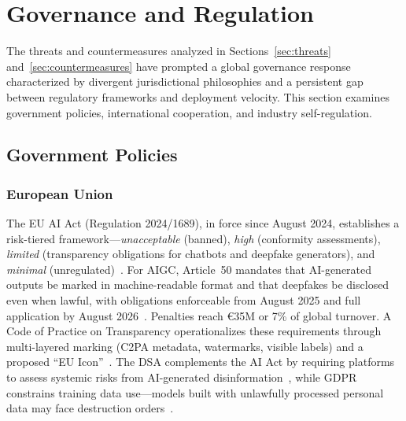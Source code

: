 
\section{Governance and Regulation}
\label{sec:governance}

The threats and countermeasures analyzed in Sections~\ref{sec:threats} and~\ref{sec:countermeasures} have prompted a global governance response characterized by divergent jurisdictional philosophies and a persistent gap between regulatory frameworks and deployment velocity. This section examines government policies, international cooperation, and industry self-regulation.


\subsection{Government Policies}
\label{sec:gov-policy}

\subsubsection{European Union}
\label{sec:gov-eu}

The EU AI Act (Regulation 2024/1689), in force since August 2024, establishes a risk-tiered framework---\emph{unacceptable} (banned), \emph{high} (conformity assessments), \emph{limited} (transparency obligations for chatbots and deepfake generators), and \emph{minimal} (unregulated)~\cite{euaiact2024}. For AIGC, Article~50 mandates that AI-generated outputs be marked in machine-readable format and that deepfakes be disclosed even when lawful, with obligations enforceable from August 2025 and full application by August 2026~\cite{euaiact_art50}. Penalties reach \euro35M or 7\% of global turnover. A Code of Practice on Transparency operationalizes these requirements through multi-layered marking (C2PA metadata, watermarks, visible labels) and a proposed ``EU Icon''~\cite{eucode2025}. The DSA complements the AI Act by requiring platforms to assess systemic risks from AI-generated disinformation~\cite{dsa2024}, while GDPR constrains training data use---models built with unlawfully processed personal data may face destruction orders~\cite{cnil2025,edpb2024}.


